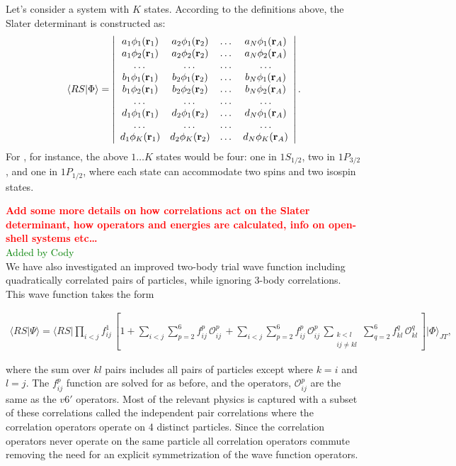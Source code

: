 \documentclass[aps,prc,twocolumn,superscriptaddress,floatfix]{revtex4-1}
\newcommand{\red}[1]{\protect\textcolor{red}{#1}}
\newcommand{\green}[1]{\protect\textcolor{green}{#1}}
\begin{document}
Let's consider a system with $K$ states. According to the definitions above, 
the Slater determinant is constructed as:
\begin{align}
\langle RS|\Phi\rangle=
\left|
\begin{array}{cccc}
a_1\phi_1(\vb{r}_1) & a_2\phi_1(\vb{r}_2) & \dots & a_N\phi_1(\vb{r}_A) \\
a_1\phi_2(\vb{r}_1) & a_2\phi_2(\vb{r}_2) & \dots & a_N\phi_2(\vb{r}_A) \\
\dots & \dots & \dots & \dots \\
b_1\phi_1(\vb{r}_1) & b_2\phi_1(\vb{r}_2) & \dots & b_N\phi_1(\vb{r}_A) \\
b_1\phi_2(\vb{r}_1) & b_2\phi_2(\vb{r}_2) & \dots & b_N\phi_2(\vb{r}_A) \\
\dots & \dots & \dots & \dots \\
d_1\phi_1(\vb{r}_1) & d_2\phi_1(\vb{r}_2) & \dots & d_N\phi_1(\vb{r}_A) \\
\dots & \dots & \dots & \dots \\
d_1\phi_K(\vb{r}_1) & d_2\phi_K(\vb{r}_2) & \dots & d_N\phi_K(\vb{r}_A) \\
\end{array}
\right| .
\nonumber
\end{align}
For , for instance, the above $1\ldots K$ states would be four: 
one in $1S_{1/2}$, two in $1P_{3/2}$, and one in $1P_{1/2}$, where each state can 
accommodate two spins and two isospin states.

\red{\bf Add some more details on how correlations act on the Slater determinant, how
operators and energies are calculated, info on open-shell systems etc\ldots}
\green{\\ Added by Cody \\}
We have also investigated an improved two-body trial wave function including quadratically correlated pairs of particles, while ignoring 3-body correlations. This wave function takes the form
\begin{widetext}
\begin{align}
\langle RS|\Psi\rangle=\langle RS|\prod_{i<j}f^1_{ij}\,
\left[1+\sum_{i<j}\sum_{p=2}^6 f^p_{ij}\,\mathcal O_{ij}^p\,
+\sum_{i<j}\sum_{p=2}^6 f^p_{ij}\,\mathcal O_{ij}^p\, \sum_{\substack{k<l\\ij\ne kl}}\sum_{q=2}^6 f^q_{kl}\,\mathcal O_{kl}^q\,\right]|\Phi\rangle_{JT} ,
\label{eq:psi}
\end{align}
\end{widetext}
where the sum over $kl$ pairs includes all pairs of particles except where $k=i$ and $l=j$. The $f^p_{ij}$ function are solved for as before, and the operators, $\mathcal{O}^p_{ij}$ are the same as the $v6'$ operators. Most of the relevant physics is captured with a subset of these correlations called the independent pair correlations where the correlation operators operate on 4 distinct particles. Since the correlation operators never operate on the same particle all correlation operators commute removing the need for an explicit symmetrization of the wave function operators.
\end{document}
